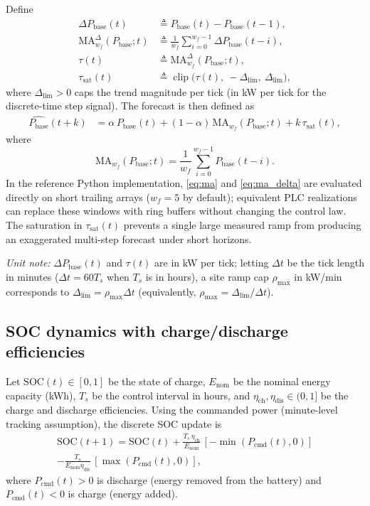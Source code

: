 \documentclass[preprint,12pt]{elsarticle}
\newcommand{\SOC}{\mathrm{SOC}}
\newcommand{\Pcmd}{P_{\mathrm{cmd}}}
\newcommand{\Pbase}{P_{\mathrm{base}}}
\newcommand{\MA}{\mathrm{MA}}
\newcommand{\Ts}{T_s}
\newcommand{\Dlim}{\Delta_{\lim}}
\DeclareMathOperator{\clip}{clip}
\begin{document}
Define
\begin{align}
\Delta \Pbase(t) &\triangleq \Pbase(t)-\Pbase(t-1), \label{eq:dpbase_def}\\
\MA^{\Delta}_{w_f}(\Pbase;t) &\triangleq \frac{1}{w_f}\sum_{i=0}^{w_f-1}\Delta \Pbase(t-i), \label{eq:ma_delta}\\
\tau(t) &\triangleq \MA^{\Delta}_{w_f}(\Pbase;t), \\
\tau_{\mathrm{sat}}(t) &\triangleq \clip\!\big(\tau(t),\ -\Dlim,\ \Dlim\big),
\end{align}
where $\Dlim>0$ caps the trend magnitude per tick (in kW per tick for the discrete-time step signal).
The forecast is then defined as
\begin{align}
\widehat{\Pbase}(t+k)
&= \alpha\,\Pbase(t) + (1-\alpha)\,\MA_{w_f}(\Pbase;t)
+ k\,\tau_{\mathrm{sat}}(t),
\label{eq:forecast}
\end{align}
where
\begin{equation}
\MA_{w_f}(\Pbase;t)=\frac{1}{w_f}\sum_{i=0}^{w_f-1}\Pbase(t-i).
\label{eq:ma}
\end{equation}
In the reference Python implementation, \eqref{eq:ma} and \eqref{eq:ma_delta} are evaluated directly on short trailing arrays ($w_f=5$ by default); equivalent PLC realizations can replace these windows with ring buffers without changing the control law.
The saturation in $\tau_{\mathrm{sat}}(t)$ prevents a single large measured ramp from producing an exaggerated multi-step forecast under short horizons.

\textit{Unit note:} $\Delta\Pbase(t)$ and $\tau(t)$ are in kW per tick; letting $\Delta t$ be the tick length in minutes ($\Delta t=60\Ts$ when $\Ts$ is in hours), a site ramp cap $\rho_{\max}$ in kW/min corresponds to $\Dlim=\rho_{\max}\Delta t$ (equivalently, $\rho_{\max}=\Dlim/\Delta t$).

\subsection{SOC dynamics with charge/discharge efficiencies}
Let $\SOC(t)\in[0,1]$ be the state of charge, $E_{\mathrm{nom}}$ be the nominal energy capacity (kWh),
$\Ts$ be the control interval in hours, and $\eta_{\mathrm{ch}},\eta_{\mathrm{dis}}\in(0,1]$ be the
charge and discharge efficiencies. Using the commanded power (minute-level tracking assumption),
the discrete SOC update is
\begin{multline}
\SOC(t{+}1)=\SOC(t)
+ \frac{\Ts\,\eta_{\mathrm{ch}}}{E_{\mathrm{nom}}}\,[ -\min(\Pcmd(t),0)] \\
- \frac{\Ts}{E_{\mathrm{nom}}\eta_{\mathrm{dis}}}\,[\max(\Pcmd(t),0)],
\label{eq:soc_update}
\end{multline}
where $\Pcmd(t)>0$ is discharge (energy removed from the battery) and $\Pcmd(t)<0$ is charge (energy added).
\end{document}
